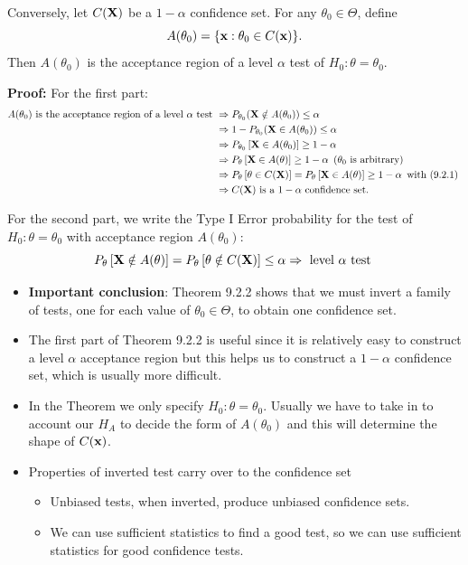 \documentclass[11pt,]{article}
\def\bx{{\bf x}}
\def\bX{{\bf X}}
\begin{document}
Conversely, let \(C(\bX)\) be a \(1-\alpha\) confidence set. For any
\(\theta_0 \in \Theta\), define
\[A(\theta_0) = \{ \bx : \theta_0 \in C(\bx)\}.\] Then \(A(\theta_0)\)
is the acceptance region of a level \(\alpha\) test of
\(H_0: \theta = \theta_0\).

\noindent\textbf{Proof:} For the first part: \begin{align*}
A(\theta_0) \mbox{ is the acceptance region of a level } \alpha \mbox{ test } &\Rightarrow P_{\theta_0} (\bX \notin A(\theta_0)) \leq \alpha \\ 
&\Rightarrow 1-P_{\theta_0} (\bX \in A(\theta_0)) \leq \alpha \\ 
&\Rightarrow P_{\theta_0} \left[\bX \in A(\theta_0)\right] \geq 1- \alpha  \\
&\Rightarrow P_{\theta} \left[\bX \in A(\theta)\right] \geq 1- \alpha \,  \mbox{ ($\theta_0$ is arbitrary)}\\
&\Rightarrow P_{\theta}\left[\theta \in C(\bX)\right] = P_\theta\left[\bX \in A(\theta)\right] \geq 1 - \alpha \, \mbox{ with (9.2.1) }\\
&\Rightarrow C(\bX) \mbox{ is a } 1-\alpha \mbox{ confidence set.}
\end{align*}

For the second part, we write the Type I Error probability for the test
of \(H_0: \theta = \theta_0\) with acceptance region \(A(\theta_0)\):
\[P_{\theta} \left[\bX \notin A(\theta)\right]= P_{\theta}\left[\theta \notin C(\bX)\right] \leq \alpha \Rightarrow \mbox{ level } \alpha \mbox{ test }\]

\begin{itemize}
\item \textbf{Important conclusion}: Theorem 9.2.2 shows that we must invert a family of tests, one for each value of $\theta_0 \in \Theta$, to obtain one confidence set.
\item The first part of Theorem 9.2.2 is useful since it is relatively easy to construct a level $\alpha$ acceptance region but this helps us to construct a $1-\alpha$ confidence set, which is usually more difficult.
\item In the Theorem we only specify $H_0: \theta = \theta_0$. Usually we have to take in to account our $H_A$ to decide the form of $A(\theta_0)$ and this will determine the shape of $C(\bx)$.
\item Properties of inverted test carry over to the confidence set
\begin{itemize}
\item Unbiased tests, when inverted, produce unbiased confidence sets.
\item We can use sufficient statistics to find a good test, so we can use sufficient statistics for good confidence tests.
\end{itemize}
\end{itemize}
\end{document}
